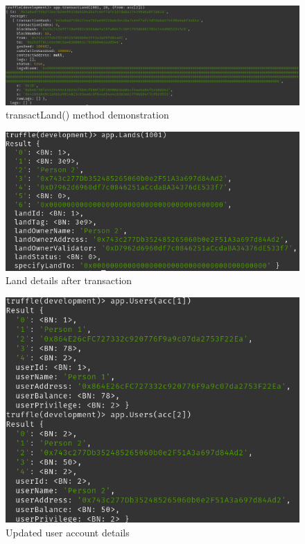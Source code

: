 \documentclass[11pt]{article}
\begin{document}
\begin{figure}[htbp]
\centering
\includegraphics[width=.9\linewidth]{./transact-land.png}
\caption{transactLand() method demonstration}
\end{figure}

\begin{figure}[htbp]
\centering
\includegraphics[width=.9\linewidth]{./land-status-after-transaction.png}
\caption{Land details after transaction}
\end{figure}

\begin{figure}[htbp]
\centering
\includegraphics[width=.9\linewidth]{./user-status-after-transaction.png}
\caption{Updated user account details}
\end{figure}
\end{document}
